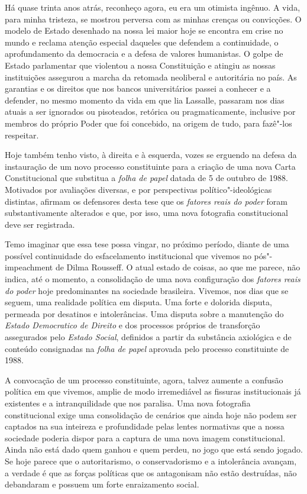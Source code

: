 Há quase trinta anos atrás, reconheço agora, eu era um otimista ingênuo.
A vida, para minha tristeza, se mostrou perversa com as minhas crenças
ou convicções. O modelo de Estado desenhado na nossa lei maior hoje se
encontra em crise no mundo e reclama atenção especial daqueles que
defendem a continuidade, o aprofundamento da democracia e a defesa de
valores humanistas. O golpe de Estado parlamentar que violentou a nossa
Constituição e atingiu as nossas instituições assegurou a marcha da
retomada neoliberal e autoritária no país. As garantias e os direitos
que nos bancos universitários passei a conhecer e a defender, no mesmo
momento da vida em que lia Lassalle, passaram nos dias atuais a ser
ignorados ou pisoteados, retórica ou pragmaticamente, inclusive por
membros do próprio Poder que foi concebido, na origem de tudo, para
fazê"-los respeitar.

Hoje também tenho visto, à direita e à esquerda, vozes se erguendo na
defesa da instauração de um novo processo constituinte para a criação de
uma nova Carta Constitucional que substitua a \emph{folha de papel}
datada de 5 de outubro de 1988. Motivados por avaliações diversas, e por
perspectivas político"-ideológicas distintas, afirmam os defensores desta
tese que os \emph{fatores reais do poder} foram substantivamente
alterados e que, por isso, uma nova fotografia constitucional deve ser
registrada.

Temo imaginar que essa tese possa vingar, no próximo período, diante de
uma possível continuidade do esfacelamento institucional que vivemos no
pós"-impeachment de Dilma Rousseff. O atual estado de
coisas, ao que me parece, não indica, até o momento, a consolidação de
uma nova configuração dos \emph{fatores reais do poder} hoje
predominantes na sociedade brasileira. Vivemos, nos dias que se seguem,
uma realidade política em disputa. Uma forte e dolorida disputa,
permeada por desatinos e intolerâncias. Uma disputa sobre a manutenção
do \emph{Estado Democratico de Direito} e dos processos próprios de
transforção assegurados pelo \emph{Estado Social}, definidos a partir da
substância axiológica e de conteúdo consignadas na \emph{folha de papel}
aprovada pelo processo constituinte de 1988.

A convocação de um processo constituinte, agora, talvez aumente a confusão
política em que vivemos, amplie de modo irremediável as fissuras
institucionais já existentes e a intranquilidade que nos paralisa. Uma
nova fotografia constitucional exige uma consolidação de cenários que
ainda hoje não podem ser captados na sua inteireza e profundidade pelas
lentes normativas que a nossa sociedade poderia dispor para a captura de
uma nova imagem constitucional. Ainda não está dado quem ganhou e quem
perdeu, no jogo que está sendo jogado. Se hoje parece que o
autoritarismo, o conservadorismo e a intolerância avançam, a verdade é
que as forças políticas que os antagonisam não estão destruídas, não
debandaram e possuem um forte enraizamento social.

